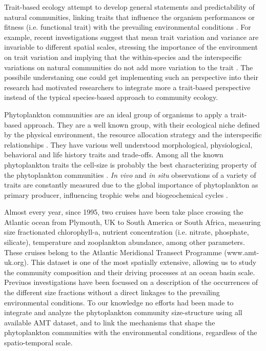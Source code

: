 Trait-based ecology attempt to develop general statements and predictability of natural communities, linking traits that influence the organism performances or fitness (i.e. functional trait) with the prevailing environmental conditions \citep{McGill2006}. For example, recent investigations suggest that mean trait variation and variance are invariable to different spatial scales, stressing the importance of the environment on trait variation and implying that the within-species and the interspecific variations on natural communities do not add more variation to the trait \citep{Messier2010}. The possibile understaning one could get implementing such an perspective into their research had motivated researchers to integrate more a trait-based perspective instead of the typical species-based approach to community ecology.

Phytoplankton communities are an ideal group of organisms to apply a trait-based approach. They are a well known group, with their ecological niche defined by the physical environment, the resource allocation strategy and the interspecific relationships \citep{Litchman2007}. They have various well understood morphological, physiological, behavioral and life history traits and trade-offs. Among all the known phytoplankton traits the cell-size is probably the best characterizing property of the phytoplankton communities \citep{Litchman2008,Litchman2010}. \textit{In vivo} and \textit{in situ} observations of a variety of traits are constantly measured due to the global importance of phytoplankton as primary producer, influencing trophic webs and biogeochemical cycles \citep{Falkowski1998}.

Almost every year, since 1995, two cruises have been take place crossing the Atlantic ocean from Plymouth, UK to South America or South Africa, measuring size fractionated chlorophyll-a, nutrient concentration (i.e. nitrate, phosphate, silicate), temperature and zooplankton abundance, among other parameters. These cruises belong to the Atlantic Meridional Transect Programme (www.amt-uk.org). This dataset is one of the most spatially extensive, allowing us to study the community composition and their driving processes at an ocean basin scale. Previuos investigations have been focussed on a description of the occurrences of the different size fractions \citep{Maranon2001} without a direct linkages to the prevailing environmental conditions. To our knowledge no efforts had been made to integrate and analyze the phytoplankton community size-structure using all available AMT dataset, and to link the mechanisms that shape the phytoplankton communities with the environmental conditions, regardless of the spatio-temporal scale.

